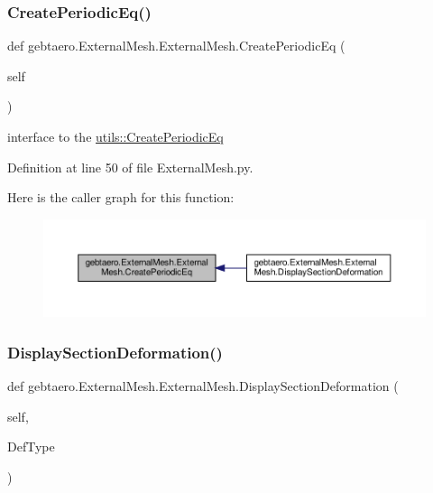 \subsubsection{\texorpdfstring{Create\+Periodic\+Eq()}{CreatePeriodicEq()}}
{\footnotesize\ttfamily def gebtaero.\+External\+Mesh.\+External\+Mesh.\+Create\+Periodic\+Eq (\begin{DoxyParamCaption}\item[{}]{self }\end{DoxyParamCaption})}



interface to the \hyperlink{namespacegebtaero_1_1utils_a4f786ecbe66af9f64c802adf4e0a990f}{utils\+::\+Create\+Periodic\+Eq} 



Definition at line 50 of file External\+Mesh.\+py.

Here is the caller graph for this function\+:\nopagebreak
\begin{figure}[H]
\begin{center}
\leavevmode
\includegraphics[width=350pt]{classgebtaero_1_1_external_mesh_1_1_external_mesh_aea59f570ee7b3c010c86c61384472834_icgraph}
\end{center}
\end{figure}
\mbox{\label{classgebtaero_1_1_external_mesh_1_1_external_mesh_a6cad952ce309870f33277bb9a89c5ca1}} 
\subsubsection{\texorpdfstring{Display\+Section\+Deformation()}{DisplaySectionDeformation()}}
{\footnotesize\ttfamily def gebtaero.\+External\+Mesh.\+External\+Mesh.\+Display\+Section\+Deformation (\begin{DoxyParamCaption}\item[{}]{self,  }\item[{}]{Def\+Type }\end{DoxyParamCaption})}



